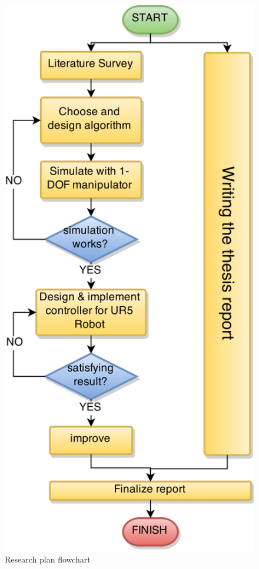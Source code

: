\begin{figure}
\centering
\includegraphics[width=0.5\linewidth]{Drawing1}
\caption{Research plan flowchart}
\label{fig:flowchart}
\end{figure}


